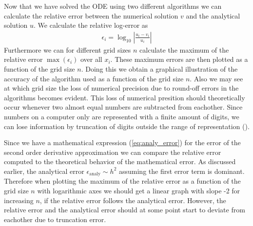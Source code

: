 \documentclass[twocolumn]{aastex62}
\begin{document}
Now that we have solved the ODE using two different algorithms we can calculate the relative error between the numerical solution $v$ and the analytical solution $u$. We calculate the relative log-error as 
\begin{align}
	\epsilon_i = \log_{10} \left|\frac{u_i - v_i}{u_i}\right|
	\label{eq:rel_error}
\end{align}
Furthermore we can for different grid sizes $n$ calculate the maximum of the relative error $\max(\epsilon_i)$ over all $x_i$. These maximum errors are then plotted as a function of the grid size $n$. Doing this we obtain a graphical illustration of the accuracy of the algorithm used as a function of the grid size $n$. Also we may see at which grid size the loss of numerical precision due to round-off errors in the algorithms becomes evident. This loss of numerical presition should theoretically occur whenever two almost equal numbers are subtracted from eachother. Since numbers on a computer only are represented with a finite amount of digits, we can lose information by truncation of digits outside the range of representation (\citep[ch 4.2]{Morken:2017}).

Since we have a mathematical expression (\ref{eq:analy_error}) for the error of the second order derivative approximation we can compare the relative error computed to the theoretical behavior of the mathematical error. As discussed earlier, the analytical error $\epsilon_\text{analy} \sim h^2$ assuming the first error term is dominant. Therefore when plotting the maximum of the relative error as a function of the grid size $n$ with logarithmic axes we should get a linear graph with slope -2 for increasing $n$, if the relative error follows the analytical error. However, the relative error and the analytical error should at some point start to deviate from eachother due to truncation error. 
\end{document}
